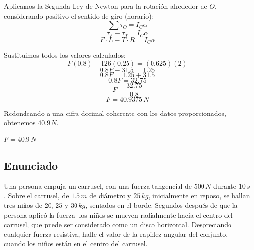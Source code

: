 \documentclass[12pt, a4paper]{article}
\begin{document}
Aplicamos la Segunda Ley de Newton para la rotación alrededor de $O$, considerando positivo el sentido de giro (horario):
$$\sum \tau_O = I_C \alpha$$
$$\tau_F - \tau_T = I_C \alpha$$
$$F \cdot L - T \cdot R = I_C \alpha$$

Sustituimos todos los valores calculados:
$$F (0.8) - 126 (0.25) = (0.625)(2)$$
$$0.8 F - 31.5 = 1.25$$
$$0.8 F = 1.25 + 31.5$$
$$0.8 F = 32.75$$
$$F = \frac{32.75}{0.8}$$
$$F = 40.9375 \, \si{N}$$

Redondeando a una cifra decimal coherente con los datos proporcionados, obtenemos $40.9 \, \si{N}$.

\begin{tcolorbox}[colback=green!5!white, colframe=green!50!black, title=Respuesta Final]
\centering \Large $F = 40.9 \, \si{N}$
\end{tcolorbox}

\newpage

\subsection*{Enunciado}
Una persona empuja un carrusel, con una fuerza tangencial de $500 \, \si{N}$ durante $10 \, \si{s}$. Sobre el carrusel, de $1.5 \, \si{m}$ de diámetro y $25 \, \si{kg}$, inicialmente en reposo, se hallan tres niños de $20$, $25$ y $30 \, \si{kg}$, sentados en el borde. Segundos después de que la persona aplicó la fuerza, los niños se mueven radialmente hacia el centro del carrusel, que puede ser considerado como un disco horizontal. Despreciando cualquier fuerza resistiva, halle el valor de la rapidez angular del conjunto, cuando los niños están en el centro del carrusel.

\begin{center}
\end{center}
\end{document}
